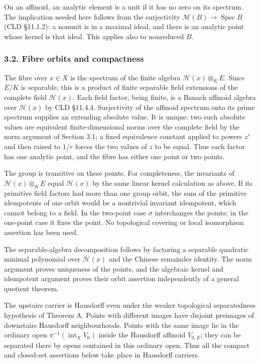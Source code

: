 \documentclass[
  11pt,
]{article}
\begin{document}
On an affinoid, an analytic element is a unit if it has no zero on its
spectrum. The implication needed here follows from the surjectivity
\(\mathcal M(B)\to\operatorname{Spec}B\) (CLD §11.1.2): a nonunit is in
a maximal ideal, and there is an analytic point whose kernel is that
ideal. This applies also to nonreduced \(B\).

\subsubsection{3.2. Fibre orbits and
compactness}\label{fibre-orbits-and-compactness}

The fibre over \(x\in X\) is the spectrum of the finite algebra
\(\mathcal H(x)\otimes_K E\). Since \(E/K\) is separable, this is a
product of finite separable field extensions of the complete field
\(\mathcal H(x)\). Each field factor, being finite, is a Banach affinoid
algebra over \(\mathcal H(x)\) by CLD §11.4.4. Surjectivity of the
affinoid spectrum onto its prime spectrum supplies an extending absolute
value. It is unique: two such absolute values are equivalent
finite-dimensional norms over the complete field by the norm argument of
Section 3.1; a fixed equivalence constant applied to powers \(z^r\) and
then raised to \(1/r\) forces the two values of \(z\) to be equal. Thus
each factor has one analytic point, and the fibre has either one point
or two points.

The group is transitive on these points. For completeness, the
invariants of \(\mathcal H(x)\otimes_K E\) equal \(\mathcal H(x)\) by
the same linear kernel calculation as above. If its primitive field
factors had more than one group orbit, the sum of the primitive
idempotents of one orbit would be a nontrivial invariant idempotent,
which cannot belong to a field. In the two-point case \(\sigma\)
interchanges the points; in the one-point case it fixes the point. No
topological covering or local isomorphism assertion has been used.

The separable-algebra decomposition follows by factoring a separable
quadratic minimal polynomial over \(\mathcal H(x)\) and the Chinese
remainder identity. The norm argument proves uniqueness of the points,
and the algebraic kernel and idempotent argument proves their orbit
assertion independently of a general quotient theorem.

The upstairs carrier is Hausdorff even under the weaker topological
separatedness hypothesis of Theorem A. Points with different images have
disjoint preimages of downstairs Hausdorff neighbourhoods. Points with
the same image lie in the ordinary open
\(\pi^{-1}(\operatorname{int}_X V_0)\) inside the Hausdorff affinoid
\(V_{0,E}\); they can be separated there by opens contained in this
ordinary open. Thus all the compact and closed-set assertions below take
place in Hausdorff carriers.
\end{document}
